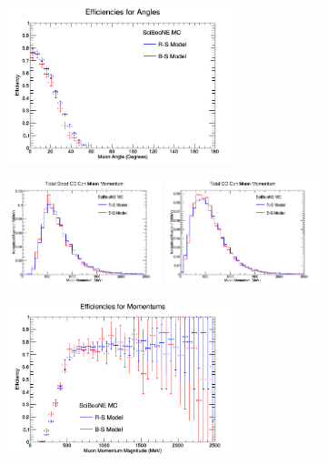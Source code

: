 \documentclass[11pt]{article}
\begin{document}
\begin{figure}[H]
\centering
\includegraphics[width=0.6\textwidth]{ANMCombinedPlotsImages/17-ANMCombinedPlots.png}
\caption{}
\end{figure}

\begin{figure}[H]
\centering
\includegraphics[width=0.4\textwidth]{ANMCombinedPlotsImages/12-ANMCombinedPlots.png}
\includegraphics[width=0.4\textwidth]{ANMCombinedPlotsImages/14-ANMCombinedPlots.png}
\caption{}
\end{figure}

\begin{figure}[H]
\centering
\includegraphics[width=0.6\textwidth]{ANMCombinedPlotsImages/18-ANMCombinedPlots.png}
\caption{}
\end{figure}
\end{document}

